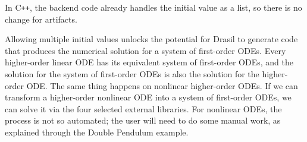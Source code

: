 In C\texttt{++}, the backend code already handles the initial value as a list, so there is no change for artifacts.




Allowing multiple initial values unlocks the potential for Drasil to generate code that produces the numerical solution for a system of first-order ODEs. Every higher-order linear ODE has its equivalent system of first-order ODEs, and the solution for the system of first-order ODEs is also the solution for the higher-order ODE. The same thing happens on nonlinear higher-order ODEs. If we can transform a higher-order nonlinear ODE into a system of first-order ODEs, we can solve it via the four selected external libraries. For nonlinear ODEs, the process is not so automated; the user will need to do some manual work, as explained through the Double Pendulum example.


